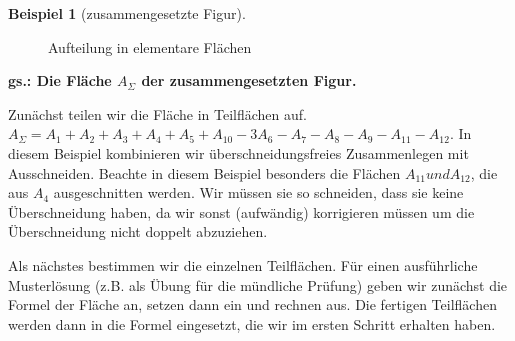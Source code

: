\documentclass[a4paper]{book}%
\theoremstyle{definition}
\newtheorem{beispiel}{Beispiel}
\begin{document}
\begin{beispiel}[zusammengesetzte Figur]
\begin{figure}[ht]
      \caption{Aufteilung in elementare Flächen}\label{fig:ZusammengesetzteFiguren}
    \end{figure}

    \textbf{gs.: Die Fläche $A_{\Sigma}$ der zusammengesetzten Figur.}

    Zunächst teilen wir die Fläche in Teilflächen auf. $A_{\Sigma} = A_1 + A_2 + A_3 + A_4 + A_5 + A_{10} - 3 A_6 - A_7 - A_8 - A_9 - A_{11} - A_{12}$. In diesem Beispiel kombinieren wir überschneidungsfreies Zusammenlegen mit Ausschneiden. Beachte in diesem Beispiel besonders die Flächen  $A_{11} und A_{12}$, die aus $A_4$ ausgeschnitten werden. Wir müssen sie so schneiden, dass sie keine Überschneidung haben, da wir sonst (aufwändig) korrigieren müssen um die Überschneidung nicht doppelt abzuziehen.

    Als nächstes bestimmen wir die einzelnen Teilflächen. Für einen ausführliche Musterlösung (z.B. als Übung für die mündliche Prüfung) geben wir zunächst die Formel der Fläche an, setzen dann ein und rechnen aus. Die fertigen Teilflächen werden dann in die Formel eingesetzt, die wir im ersten Schritt erhalten haben.


\end{beispiel}
\end{document}
